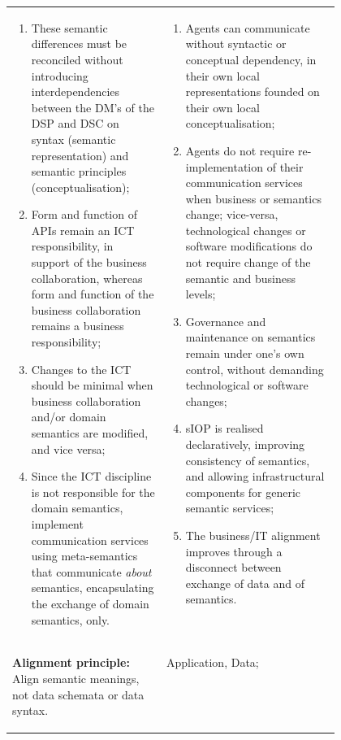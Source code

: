 \begin{xltabular}[l]{\linewidth}{@{} >{\small\raggedright\arraybackslash}p{0.47\linewidth} >{\small\raggedright\arraybackslash}X @{}}
\begin{enumerate}[left=6pt, nosep]
  \item These semantic differences must be reconciled without introducing interdependencies between the DM's of the DSP and DSC on syntax (semantic representation) and semantic principles (conceptualisation);
  \item Form and function of APIs remain an ICT responsibility, in support of the business collaboration, whereas form and function of the business collaboration remains a business responsibility;
  \item Changes to the ICT should be minimal when business collaboration and/or domain semantics are modified, and vice versa;
  \item Since the ICT discipline is not responsible for the domain semantics, implement communication services using meta-semantics that communicate \emph{about} semantics, encapsulating the exchange of domain semantics, only.
\end{enumerate}
&
\begin{enumerate}[left=10pt, nosep]
  \item Agents can communicate without syntactic or conceptual dependency, in their own local representations founded on their own local conceptualisation;
  \item Agents do not require re-implementation of their communication services when business or semantics change; vice-versa, technological changes or software modifications do not require change of the semantic and business levels;
  \item Governance and maintenance on semantics remain under one's own control, without demanding technological or software changes;
  \item sIOP is realised declaratively, improving consistency of semantics, and allowing infrastructural components for generic semantic services;
  \item The business/IT alignment improves through a disconnect between exchange of data and of semantics.
\end{enumerate} \\
%
%
%
\begin{mmdp}\label{dp:alignment}{\bfseries Alignment principle:}
\quad Align semantic meanings, not data schemata or data syntax.  \end{mmdp}
&
\begin{description}[labelwidth=3.7cm,leftmargin=3.7cm+1ex,nosep,topsep=2ex,labelsep=1ex,font=\bfseries]
  \item[Type of information:] Application, Data;

\end{description}
\end{xltabular}

